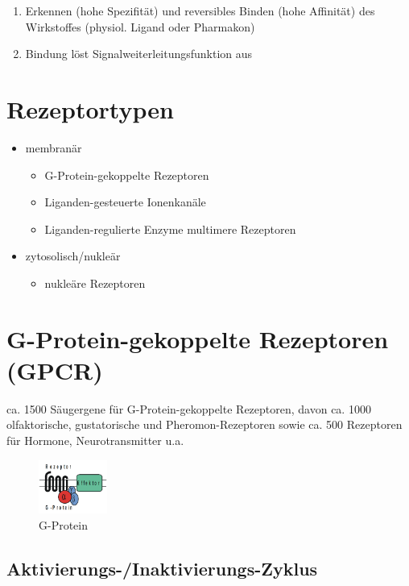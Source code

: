 \documentclass[10pt,a4paper]{report}
\begin{document}
\begin{enumerate}
	\item Erkennen (hohe Spezifität) und reversibles Binden (hohe Affinität) des Wirkstoffes (physiol. Ligand oder Pharmakon)
	\item Bindung löst Signalweiterleitungsfunktion aus
\end{enumerate}

\section{Rezeptortypen}

\begin{itemize}
	\item membranär
	\begin{itemize}
		\item G-Protein-gekoppelte Rezeptoren
		\item Liganden-gesteuerte Ionenkanäle
		\item Liganden-regulierte Enzyme multimere Rezeptoren 
	\end{itemize}
	\item zytosolisch/nukleär
	\begin{itemize}
		\item nukleäre Rezeptoren
	\end{itemize}
\end{itemize}

\section{G-Protein-gekoppelte Rezeptoren (GPCR)}
ca. 1500 Säugergene für G-Protein-gekoppelte Rezeptoren, davon ca. 1000 olfaktorische, gustatorische und Pheromon-Rezeptoren sowie ca. 500 Rezeptoren für Hormone, Neurotransmitter u.a.

\begin{figure}
	\centering
	\includegraphics[width=0.2\textwidth]{Bilder/gprotein.png}
	\caption{G-Protein}
	\label{fig:gprotein}
\end{figure}

\subsection{Aktivierungs-/Inaktivierungs-Zyklus}
\end{document}
